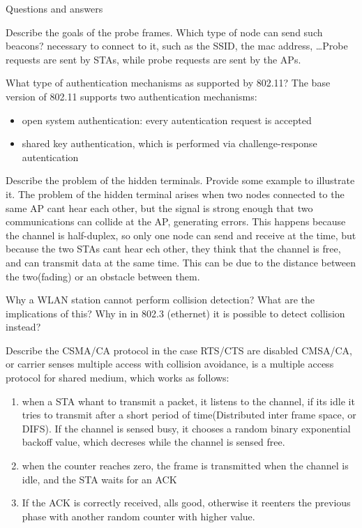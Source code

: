\begin{section}{Questions and answers}
\begin{subsubsection}{Describe the goals of the probe frames. Which type of
    node can send such beacons?}
    necessary to connect to it, such as the SSID, the mac address, \dots Probe requests are sent by
    STAs, while probe requests are sent by the APs.
  \end{subsubsection}
  \begin{subsubsection}{What type of authentication mechanisms as supported by
    802.11?}
    The base version of 802.11 supports two authentication mechanisms:
    \begin{itemize}
      \item open system authentication: every autentication request is accepted
      \item shared key authentication, which is performed via challenge-response autentication 
    \end{itemize}
  \end{subsubsection}
  \begin{subsubsection}{Describe the problem of the hidden terminals. Provide
    some example to illustrate it.}
    The problem of the hidden terminal arises when two nodes connected to the same AP cant hear each
    other, but the signal is strong enough that two communications can collide at the AP, generating
    errors. This happens because the channel is half-duplex, so only one node can send and receive
    at the time, but because the two STAs cant hear ech other, they think that the channel is free,
    and can transmit data at the same time. This can be due to the distance between the two(fading)
    or an obstacle between them.
  \end{subsubsection}
  \begin{subsubsection}{Why a WLAN station cannot perform collision detection?
      What are the implications of this? Why in in 802.3 (ethernet) it is
    possible to detect collision instead?}
  \end{subsubsection}
  \begin{subsubsection}{Describe the CSMA/CA protocol in the case RTS/CTS are
    disabled}
    CMSA/CA, or carrier senses multiple access with collision avoidance, is a multiple access
    protocol for shared medium, which works as follows:
    \begin{enumerate}
      \item when a STA whant to transmit a packet, it listens to the channel, if its idle it tries
        to transmit after a short period of time(Distributed inter frame space, or DIFS). If the
        channel is sensed busy, it chooses a random binary exponential backoff value, which
        decreses while the channel is sensed free.
      \item when the counter reaches zero, the frame is transmitted when the channel is idle, and
        the STA waits for an ACK
      \item If the ACK is correctly received, alls good, otherwise it reenters the previous phase
        with another random counter with higher value. 
    \end{enumerate}
  \end{subsubsection}


\end{section}
